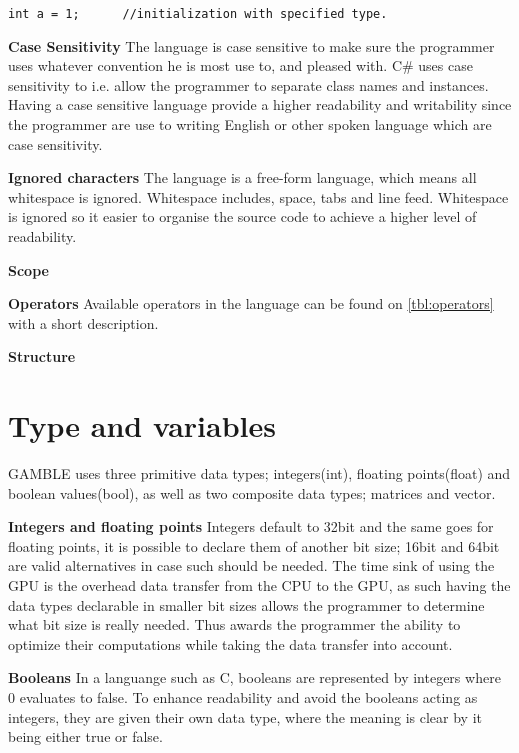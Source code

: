 \begin{lstlisting}[caption={Comment and Semicolon},label={lst:CommSemi}]
int a = 1;		//initialization with specified type.
\end{lstlisting}

\textbf{Case Sensitivity}
The language is case sensitive to make sure the programmer uses whatever convention he is most use to, and pleased with.
C\# uses case sensitivity to i.e. allow the programmer to separate class names and instances.
Having a case sensitive language provide a higher readability and writability since the programmer are use to writing English or other spoken language which are case sensitivity.

\textbf{Ignored characters}
The language is a free-form language, which means all whitespace is ignored.
Whitespace includes, space, tabs and line feed.
Whitespace is ignored so it easier to organise the source code to achieve a higher level of readability.

\textbf{Scope}

\textbf{Operators}
Available operators in the language can be found on \ref{tbl:operators} with a short description.
  

\textbf{Structure} 


\section{Type and variables}
GAMBLE uses three primitive data types; integers(int), floating points(float) and boolean values(bool), as well as two composite data types; matrices and vector.

\textbf{Integers and floating points}
Integers default to 32bit and the same goes for floating points, it is possible to declare them of another bit size; 16bit and 64bit are valid alternatives in case such should be needed.%
The time sink of using the GPU is the overhead data transfer from the CPU to the GPU, as such having the data types declarable in smaller bit sizes allows the programmer to determine what bit size is really needed.
Thus awards the programmer the ability to optimize their computations while taking the data transfer into account.

\textbf{Booleans}
In a languange such as C, booleans are represented by integers where 0 evaluates to false.
To enhance readability and avoid the booleans acting as integers, they are given their own data type, where the meaning is clear by it being either true or false.

